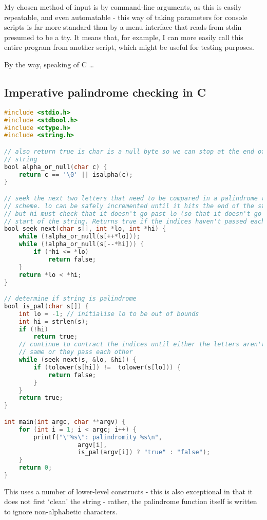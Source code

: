 \documentclass{article}
\begin{document}
    My chosen method of input is by command-line arguments, as this is easily
    repeatable, and even automatable - this way of taking parameters for
    console scripts is far more standard than by a menu interface that reads
    from stdin presumed to be a tty. It means that, for example, I can more
    easily call this entire program from another script, which might be useful
    for testing purposes.

    By the way, speaking of C \ldots

    \subsection{Imperative palindrome checking in C}

\begin{lstlisting}[language=C, caption=Palindrome function in C]
#include <stdio.h>
#include <stdbool.h>
#include <ctype.h>
#include <string.h>

// also return true is char is a null byte so we can stop at the end of the
// string
bool alpha_or_null(char c) {
    return c == '\0' || isalpha(c);
}

// seek the next two letters that need to be compared in a palindrome testing
// scheme. lo can be safely incremented until it hits the end of the string,
// but hi must check that it doesn't go past lo (so that it doesn't go past hte
// start of the string. Returns true if the indices haven't passed each other.
bool seek_next(char s[], int *lo, int *hi) {
    while (!alpha_or_null(s[++*lo]));
    while (!alpha_or_null(s[--*hi])) {
        if (*hi <= *lo)
            return false;
    }
    return *lo < *hi;
}

// determine if string is palindrome
bool is_pal(char s[]) {
    int lo = -1; // initialise lo to be out of bounds
    int hi = strlen(s);
    if (!hi)
        return true;
    // continue to contract the indices until either the letters aren't the
    // same or they pass each other
    while (seek_next(s, &lo, &hi)) {
        if (tolower(s[hi]) !=  tolower(s[lo])) {
            return false;
        }
    }
    return true;
}

int main(int argc, char **argv) {
    for (int i = 1; i < argc; i++) {
        printf("\"%s\": palindromity %s\n",
                    argv[i],
                    is_pal(argv[i]) ? "true" : "false");
    }
    return 0;
}
\end{lstlisting}

    This uses a number of lower-level constructs - this is also exceptional in
    that it does not first `clean' the string - rather, the palindrome function
    itself is written to ignore non-alphabetic characters.
\end{document}
